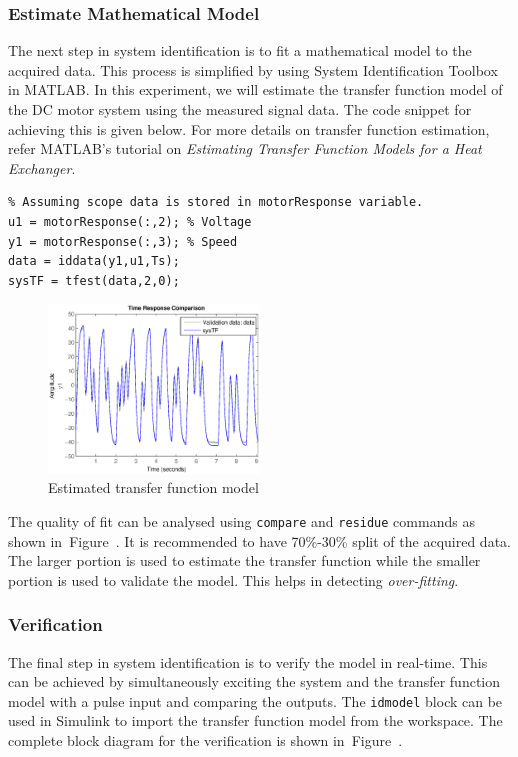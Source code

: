\documentclass[paper=a4, fontsize=11pt]{scrartcl}
\numberwithin{equation}{section}        %
\numberwithin{figure}{section}          %
\numberwithin{table}{section}           %
\begin{document}
\subsubsection{Estimate Mathematical Model}
The next step in system identification is to fit a mathematical model to the acquired data. This process is simplified by using System Identification Toolbox in MATLAB. In this experiment, we will estimate the transfer function model of the DC motor system using the measured signal data. The code snippet for achieving this is given below. For more details on transfer function estimation, refer MATLAB's tutorial on \emph{Estimating Transfer Function Models for a Heat Exchanger}.
\begin{verbatim}
% Assuming scope data is stored in motorResponse variable.
u1 = motorResponse(:,2); % Voltage
y1 = motorResponse(:,3); % Speed
data = iddata(y1,u1,Ts);
sysTF = tfest(data,2,0);
\end{verbatim}
\begin{figure}[!hbp]
	\includegraphics[width=0.5\textwidth]{tf_validate}
	\caption{Estimated transfer function model}
	\label{fig:tf_validate}
\end{figure}
The quality of fit can be analysed using \verb|compare| and \verb|residue| commands as shown in~Figure~\cite{fig:tf_validate}. It is recommended to have 70\%-30\% split of the acquired data. The larger portion is used to estimate the transfer function while the smaller portion is used to validate the model. This helps in detecting \emph{over-fitting}.

\subsubsection{Verification}
The final step in system identification is to verify the model in real-time. This can be achieved by simultaneously exciting the system and the transfer function model with a pulse input and comparing the outputs. The \verb|idmodel| block can be used in Simulink to import the transfer function model from the workspace. The complete block diagram for the verification is shown in~Figure~\cite{fig:tf_verify}.
\end{document}
